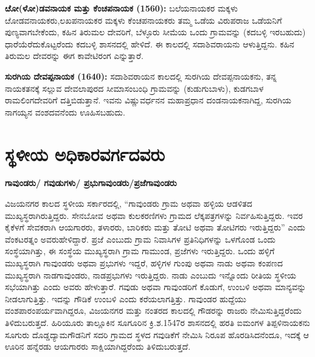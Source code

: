 \newpage

\textbf{ೞೋ(ಳೋ)ಡವನಾಯಕ ಮತ್ತು ಕೆಂಚಪನಾಯಕ (1560): }ಬಲೆಯನಾಯಕರ ಮಕ್ಕಳು ೞೋಡವನಾಯಕರು,\break ಲಖಪನಾಯಕರ ಮಕ್ಕಳು ಕೆಂಚಪನಾಯಕರು ತಮ್ಮ ಒಡೆಯ ವಿರುಪರಾಜ ಒಡೆಯನಿಗೆ ಪುಣ್ಯವಾಗಬೇಕೆಂದು, ಕಹಿನ ತಿರುಮಲ ದೇವರಿಗೆ, ಬೆಳ್ಳೂರು ಸೀಮೆಯ ಒಂದು ಗ್ರಾಮವನ್ನು (ಕದಬಳ್ಳಿ ಇರಬಹುದು) ಧಾರೆಯೆರೆದುಕೊಟ್ಟರೆಂದು ಕದಬಳ್ಳಿ ಶಾಸನದಲ್ಲಿ ಹೇಳಿದೆ. ಈ ಕಾಲದಲ್ಲಿ ಸದಾಶಿವರಾಯನು ಆಳುತ್ತಿದ್ದನು. ಕಹಿನ ತಿರುಮಲ ದೇವರನ್ನು ಈಗ ಕಾವೇಟಿರಂಗ ಎನ್ನುತ್ತಾರೆ.

\textbf{ಸುರಗಿಯ ದೇವಪ್ಪನಾಯಕ (1640):} ಸದಾಶಿವರಾಯನ ಕಾಲದಲ್ಲಿ ಸುರಗಿಯ ದೇವಪ್ಪನಾಯಕನು, ತನ್ನ ನಾಯಕ\-ತನಕ್ಕೆ ಸಲ್ಲುವ ದೇವಲಾಪುರದ ಸೀಮಾಸಂಬಂಧಿ ಗ್ರಾಮವನ್ನು (ಕುಡುಗುಬಾಳು), ಕುಡಗಬಾಳ ರಾಮಲಿಂಗದೇವರಿಗೆ ದತ್ತಿಬಿಡುತ್ತಾನೆ. ಇವನು ವಿಷ್ಣುವರ್ಧನನ ಮಹಾಪ್ರಧಾನ ದಂಡನಾಯಕನಾಗಿದ್ದ, ಸುರಗಿಯ ನಾಗಯ್ಯನ ವಂಶದವನೆಂದು ಊಹಿಸಬಹುದು.

\section*{ಸ್ಥಳೀಯ ಅಧಿಕಾರವರ್ಗದವರು}

\textbf{ಗಾವುಂಡರು/ ಗವುಡುಗಳು/ ಪ್ರಭುಗಾವುಂಡರು/ಪ್ರಜೆಗಾವುಂಡರು}

ವಿಜಯನಗರ ಕಾಲದ ಸ್ಥಳೀಯ ಸರ್ಕಾರದಲ್ಲಿ, “ಗಾವುಂಡರು ಗ್ರಾಮ ಅಥವಾ ಹಳ್ಳಿಯ ಆಡಳಿತದ ಮುಖ್ಯಸ್ಥರಾಗಿರು\-ತ್ತಿದ್ದರು. ಸೇನಬೋವ ಅಥವಾ ಕುಲಕರಣಿಗಳು ಗ್ರಾಮದ ಲೆಕ್ಕಪತ್ರಗಳನ್ನು ನಿರ್ವಹಿಸುತ್ತಿದ್ದರು. ಇವರ ಕೈಕೆಳಗೆ ಸೇವಕರಾಗಿ ಆಯಗಾರರು, ತಳಾರರು, ಬಾರಿಕರು ಮತ್ತು ತೋಟಿ ಅಥವಾ ತೋಟಿಗರು ಇರುತ್ತಿದ್ದರು” ಎಂದು ವೆಂಕಟರತ್ನಂ ಅವರುಹೇಳಿದ್ದಾರೆ. ಪ್ರಜೆ ಎಂಬುದು ಗ್ರಾಮ ನಿವಾಸಿಗಳ ಪ್ರತಿನಿಧಿಗಳನ್ನು ಒಳಗೊಂಡ ಒಂದು ಸಂಸ್ಥೆಯಾಗಿತ್ತು, ಈ ಸಂಸ್ಥೆಯ ಮುಖ್ಯಸ್ಥರಾಗಿ ಗ್ರಾಮ ಗಾಮುಂಡ, ಪ್ರಜೆಗಳು ಇರುತ್ತಿದ್ದರು. ಒಂದು ಹಳ್ಳಿಗೆ ಮುಖ್ಯಸ್ಥರಾಗಿ ಗಾವುಂಡರು ಅಥವಾ ಪ್ರಭುಗಳು ಇದ್ದರೆ, ಹಳ್ಳಿಗಳ ಗುಂಪು ಅಥವಾ ನಾಡು ಅಥವಾ ಕಂಪಣದ ಮುಖ್ಯಸ್ಥರಾಗಿ ನಾಡಗಾವುಂಡರು, ನಾಡಪ್ರಭುಗಳು ಇರುತ್ತಿದ್ದರು. ನಾಡು ಎಂಬುದು ಇನ್ನೊಂದು ರೀತಿಯ ಸ್ಥಳೀಯ ಸಭೆಯಾಗಿತ್ತು ಎಂದು ಅವರು ಹೇಳುತ್ತಾರೆ. ಗವುಡು ಅಥವಾ ಗಾವುಂಡರಿಗೆ ಕೊಡುಗೆ, ಉಂಬಳಿ ಅಥವಾ ಮಾನ್ಯವನ್ನು ನೀಡಲಾಗುತ್ತಿತ್ತು. ಇದನ್ನು ಗೌಡಿಕೆ ಉಂಬಳಿ ಎಂದು ಕರೆಯಲಾಗತ್ತಿತ್ತು. ಗಾವುಂಡರ ಹುದ್ದೆಯು ವಂಶಪಾರಂಪರ್ಯವಾಗಿದ್ದರೂ, ವಿಜಯನಗರ ಮತ್ತು ನಂತರದ ಕಾಲದಲ್ಲಿ ಗೌಡರನ್ನು ರಾಜರು ನೇಮಿಸುತ್ತಿದ್ದರೆಂದು ತಿಳಿದುಬರುತ್ತದೆ. ಹಿರಿಯೂರು ತಾಲ್ಲೂಕಿನ ಸೂಗೂರಿನ ಕ್ರಿ.ಶ.1547ರ ಶಾಸನದಲ್ಲಿ ಹರತಿ ಐಮಂಗಳ ತಿಪ್ಪಳಿನಾಯಕನು ಸೂಗುರು ದೊಡ್ಡದ್ಯಾಮಗೌಡನಿಗೆ ಸದರಿ ಗ್ರಾಮದ ಸ್ಥಳದ ಗವುಡಿಕೆಗೆ ನೇಮಿಸಿ ನಿರೂಪ ಹೊರಡಿಸಿದನೆಂದೂ, ಇದಕ್ಕೆ ಆ ಊರಿನ ಹನ್ನೆರಡು ಆಯಗಾರರು ಸಾಕ್ಷಿಯಾಗಿದ್ದರೆಂದು ತಿಳಿದುಬರುತ್ತದೆ.

